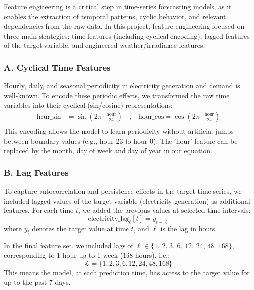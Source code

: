 Feature engineering is a critical step in time-series forecasting models, as it enables 
the extraction of temporal patterns, cyclic behavior, and relevant dependencies from the 
raw data. In this project, feature engineering focused on three main strategies: 
time features (including cyclical encoding), lagged features of the target variable, 
and engineered weather/irradiance features.

\subsubsection*{A. Cyclical Time Features}
Hourly, daily, and seasonal periodicity in electricity generation and demand is well-known. 
To encode these periodic effects, we transformed the raw time variables into their 
cyclical (sin/cosine) representations:
\[
\begin{aligned}
\text{hour\_sin}  &= \sin\left(2\pi \cdot \frac{\text{hour}}{24}\right) 
\quad \text{,} \quad 
\text{hour\_cos}  = \cos\left(2\pi \cdot \frac{\text{hour}}{24}\right) \\
\end{aligned}
\]
This encoding allows the model to learn periodicity without artificial jumps between 
boundary values (e.g., hour 23 to hour 0). The 'hour' feature can be replaced by the 
month, day of week and day of year in our equation.

\subsubsection*{B. Lag Features}
To capture autocorrelation and persistence effects in the target time series, we 
included lagged values of the target variable (electricity generation) as additional 
features. For each time $t$, we added the previous values at selected time intervals:
\[
\text{electricity\_lag}_\ell[t] = y_{t-\ell}
\]
where $y_t$ denotes the target value at time $t$, and $\ell$ is the lag in hours.

In the final feature set, we included lags of $\ell \in \{1,\, 2,\, 3,\, 6,\, 
12,\, 24,\, 48,\, 168\}$, corresponding to 1 hour up to 1 week (168 hours), i.e.:
\[
\mathcal{L} = \{1, 2, 3, 6, 12, 24, 48, 168\}
\]
This means the model, at each prediction time, has access to the target value for up 
to the past 7 days.

